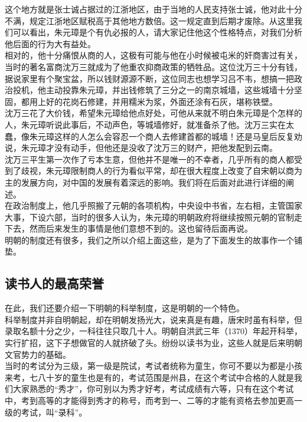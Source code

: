 \begin{multicols}{\theparacolNo}
这个地方就是张士诚占据过的江浙地区，由于当地的人民支持张士诚，他对此十分不满，规定江浙地区赋税高于其他地方数倍。这一规定直到后期才废除。从这里我们可以看出，朱元璋是个有仇必报的人，请大家记住他这个性格特点，对我们分析他后面的行为大有益处。\\

相对的，他十分痛恨从商的人，这极有可能与他在小时候被屯米的奸商害过有关，当时的著名富商沈万三就成为了他重农抑商政策的牺牲品。这位沈万三十分有钱，据说家里有个聚宝盆，所以钱财源源不断，这位同志也想学习吕不韦，想搞一把政治投机，他主动投靠朱元璋，并出钱修筑了三分之一的南京城墙，这些城墙十分坚固，都用上好的花岗石修建，并用糯米为浆，外面还涂有石灰，堪称铁壁。\\

沈万三花了大价钱，希望朱元璋给他点好处，可他从来就不明白朱元璋是个怎样的人，朱元璋听说此事后，不动声色，等城墙修好，就准备杀了他。沈万三实在太蠢，像朱元璋这样的人怎么会容忍一个商人去修建首都的城墙！还是马皇后反复劝说，朱元璋才没有动手，但他还是没收了沈万三的财产，把他发配到云南。\\

沈万三平生第一次作了亏本生意，但他并不是唯一的不幸者，几乎所有的商人都受到了歧视，朱元璋限制商人的行为看似平常，却在很大程度上改变了自宋朝以商为主的发展方向，对中国的发展有着深远的影响。我们将在后面对此进行详细的阐述。\\

在政治制度上，他几乎照搬了元朝的各项机构，中央设中书省，左右相，主管国家大事，下设六部，当时的很多人认为，朱元璋的明朝政府将继续按照元朝的官制走下去，然而后来发生的事情是他们意想不到的。这也留待后面再说。\\

明朝的制度还有很多，我们之所以介绍上面这些，是为了下面发生的故事作一个铺垫。\\

\subsection{读书人的最高荣誉}
在此，我们还要介绍一下明朝的科举制度，这是明朝的一个特色。\\

科举制度并非自明朝起，却在明朝发扬光大，说来真是有趣，唐宋时虽有科举，但录取名额十分之少，一科往往只取几十人。明朝自洪武三年（1370）年起开科举，实行扩招，这下子想做官的人就挤破了头。纷纷以读书为业，这些人就是后来明朝文官势力的基础。\\

当时的考试分为三级，第一级是院试，考试者统称为童生，你可不要以为都是小孩来考，七八十岁的童生也是有的，考试范围是州县，在这个考试中合格的人就是我们大家熟悉的“秀才”，你可别以为秀才好考，考试成绩有六等，只有在这个考试中，考到高等的才能得到秀才的称号，而考到一、二等的才能有资格去参加更高一级的考试，叫“录科”。\\


\end{multicols}
